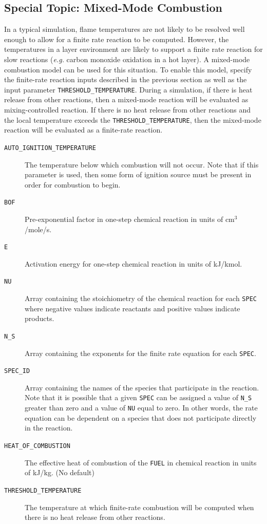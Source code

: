 \documentclass[11pt]{book}
\newcommand{\ct}{\tt\small}
\begin{document}
\subsection{Special Topic: Mixed-Mode Combustion}
\label{info:mixedmode}

In a typical simulation, flame temperatures are not likely to be resolved well enough to allow for a finite rate reaction to be computed.
However, the temperatures in a layer environment are likely to support a finite rate reaction for slow reactions ({\em e.g.} carbon monoxide oxidation in a hot layer).
A mixed-mode combustion model can be used for this situation.  To enable this model, specify the finite-rate reaction inputs described in the previous section
as well as the input parameter {\ct THRESHOLD\_TEMPERATURE}.  During a simulation, if there is heat release from other reactions,
then a mixed-mode reaction will be evaluated as mixing-controlled reaction.  If there is no heat release from other reactions and the local
temperature exceeds the {\ct THRESHOLD\_TEMPERATURE}, then the mixed-mode reaction will be evaluated as a finite-rate reaction.

\begin{description}
\item[{\ct AUTO\_IGNITION\_TEMPERATURE}] The temperature below which combustion will not occur.
Note that if this parameter is used, then some form of ignition source must be present in order for combustion to begin.
\item[{\ct BOF}] Pre-exponential factor in one-step chemical reaction in
units of cm$^3$/mole/s.
\item[{\ct E}] Activation energy for one-step chemical reaction in
units of kJ/kmol.
\item[{\ct NU}] Array containing the stoichiometry of the chemical reaction for each {\ct SPEC} where negative values indicate reactants and positive values indicate products.
\item[{\ct N\_S}] Array containing the exponents for the finite rate equation for each {\ct SPEC}.
\item[{\ct SPEC\_ID}] Array containing the names of the species that participate in the reaction. Note that it is possible that a given {\ct SPEC}
can be assigned a value of {\ct N\_S} greater than zero and a value of {\ct NU} equal to zero. In other words,
the rate equation can be dependent on a species that does not participate directly in the reaction.
\item[{\ct HEAT\_OF\_COMBUSTION}] The effective heat of combustion of the {\ct FUEL} in chemical reaction in units of kJ/kg. (No default)
\item[{\ct THRESHOLD\_TEMPERATURE}] The temperature at which finite-rate combustion will be computed when there is no heat release from other reactions.
\end{description}
\end{document}

